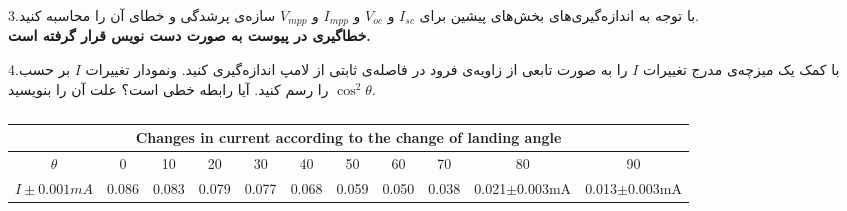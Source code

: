 \documentclass{article}
\begin{document}
	
3.با توجه به اندازه‌گیری‌های بخش‌های پیشین برای $I_{sc}$ و $V_{oc}$ و $I_{mpp}$ و $V_{mpp}$ سازه‌ی پرشدگی و خطای آن را محاسبه کنید. \\
\textbf{خطاگیری در پیوست به صورت دست نویس قرار گرفته است.}
	
	4.با کمک یک میزچه‌ی مدرج تغییرات $I$ را به صورت تابعی از زاویه‌ی فرود در فاصله‌ی ثابتی از لامپ اندازه‌گیری کنید. ونمودار تغییرات $I$ بر حسب $\cos^2 {\theta}$ را رسم کنید. آیا رابطه خطی است؟ علت آن را بنویسید.
	
\begin{latin}
\vspace{3cm}
\begin{center}
\begin{table}[h!]
\centering
\setlength{\tabcolsep}{8pt}
\renewcommand{\arraystretch}{2}
\begin{tabular}{|c|c|c|c|c|c|c|c|c|c|c|}
\hline
\multicolumn{11}{|c|}{Changes in current according to the change of landing angle} \\
\hline
$\theta$&0&10&20&30&40&50&60&70&80&90\\
\hline
$I\pm0.001mA$&0.086&0.083&0.079&0.077&0.068&0.059&0.050&0.038&0.021$\pm$0.003mA&0.013$\pm$0.003mA\\
\hline
\end{tabular}
\caption{}
\end{table}
\end{center}
\end{latin}
\end{document}

